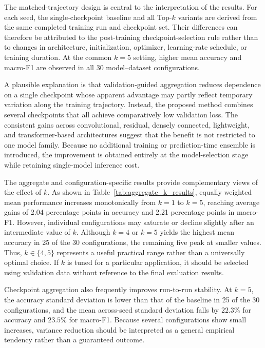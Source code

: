 \documentclass[runningheads]{llncs}
\begin{document}
The matched-trajectory design is central to the interpretation of the
results. For each seed, the single-checkpoint baseline and all Top-$k$
variants are derived from the same completed training run and checkpoint
set. Their differences can therefore be attributed to the post-training
checkpoint-selection rule rather than to changes in architecture,
initialization, optimizer, learning-rate schedule, or training duration.
At the common $k=5$ setting, higher mean accuracy and macro-F1 are observed
in all 30 model--dataset configurations.

A plausible explanation is that validation-guided aggregation reduces
dependence on a single checkpoint whose apparent advantage may partly
reflect temporary variation along the training trajectory. Instead, the
proposed method combines several checkpoints that all achieve comparatively
low validation loss. The consistent gains across convolutional, residual,
densely connected, lightweight, and transformer-based architectures suggest
that the benefit is not restricted to one model family. Because no
additional training or prediction-time ensemble is introduced, the
improvement is obtained entirely at the model-selection stage while
retaining single-model inference cost.

The aggregate and configuration-specific results provide complementary
views of the effect of $k$. As shown in
Table~\ref{tab:aggregate_k_results}, equally weighted mean performance
increases monotonically from $k=1$ to $k=5$, reaching average gains of
2.04 percentage points in accuracy and 2.21 percentage points in macro-F1.
However, individual configurations may saturate or decline slightly after
an intermediate value of $k$. Although $k=4$ or $k=5$ yields the highest
mean accuracy in 25 of the 30 configurations, the remaining five peak at
smaller values. Thus, $k\in\{4,5\}$ represents a useful practical range
rather than a universally optimal choice. If $k$ is tuned for a particular
application, it should be selected using validation data without reference
to the final evaluation results.

Checkpoint aggregation also frequently improves run-to-run stability. At
$k=5$, the accuracy standard deviation is lower than that of the baseline
in 25 of the 30 configurations, and the mean across-seed standard deviation
falls by $22.3\%$ for accuracy and $23.5\%$ for macro-F1. Because several
configurations show small increases, variance reduction should be interpreted
as a general empirical tendency rather than a guaranteed outcome.
\end{document}
